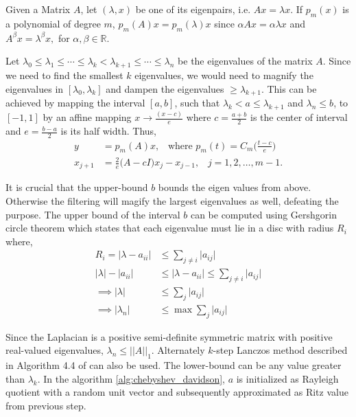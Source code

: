 \documentclass[10pt,a4paper, nocenter]{article}
\newcommand{\norm}[1]{\lvert\lvert {#1} \rvert\rvert}
\begin{document}
    Given a Matrix $A$, let $(\lambda, x)$ be one of its eigenpairs, i.e. $Ax = \lambda x$. If $p_m(x)$ is a polynomial of degree $m$, $p_m(A)x=p_m(\lambda)x$ since $\alpha Ax = \alpha\lambda x$ and $A^{\beta}x = \lambda^\beta x,$ for  $\alpha,\beta \in \mathbb{R}$. 
    
    Let $\lambda_0 \le \lambda_1 \le \cdots \le \lambda_k < \lambda_{k+1} \le \cdots \le \lambda_n$ be the eigenvalues of the matrix $A$. Since we need to find the smallest $k$ eigenvalues, we would need to magnify the eigenvalues in $[\lambda_0, \lambda_k]$ and dampen the eigenvalues $ \ge \lambda_{k+1}$. This can be achieved by mapping the interval $[a,b]$, such that $\lambda_k < a \le \lambda_{k+1}$ and $\lambda_n \le b$, to $[-1,1]$ by an affine mapping $x \to \frac{(x-c)}{e}$ where  $c = \frac{a+b}{2}$ is the center of interval and $e=\frac{b-a}{2}$ is its half width. Thus, \begin{align*}
    	y&=p_m(A)x, \hspace{10pt}\text{where }p_m(t)=C_m\bigg(\frac{t-c}{e}\bigg) \\
    	x_{j+1}&=\frac{2}{e}\big(A - cI\big)x_j - x_{j-1}, \hspace{10pt}j=1,2,\dots,m-1.
    	\end{align*}
    
    It is crucial that the upper-bound $b$ bounds the eigen values from above. Otherwise the filtering will magify the largest eigenvalues as well, defeating the purpose. The upper bound of the interval $b$ can be computed using Gershgorin circle theorem which states that each eigenvalue must lie in a disc with radius $R_i$ where, \begin{align*}
    	R_i = \lvert \lambda - a_{ii} \rvert &\le \sum_{j\ne i}\lvert a_{ij} \rvert \\
    	\lvert \lambda \rvert - \lvert a_{ii} \rvert &\le \lvert \lambda - a_{ii} \rvert \le \sum_{j\ne i}\lvert a_{ij} \rvert \\
    	\implies \lvert \lambda \rvert &\le \sum_{j}\lvert a_{ij} \rvert \\
    	\implies \lvert \lambda_n \rvert &\le \max \sum_{j}\lvert a_{ij} \rvert
    \end{align*} 
    
    Since the Laplacian is a positive semi-definite symmetric matrix with positive real-valued eigenvalues, $\lambda_n \le \norm{A}_{1}$. Alternately $k$-step Lanczos method described in Algorithm 4.4 of \cite{ZHOU2006172} can also be used. The lower-bound can be any value greater than $\lambda_k$. In the algorithm \ref{alg:chebyshev_davidson}, $a$ is initialized as Rayleigh quotient with a random unit vector and subsequently approximated as Ritz value from previous step.
    
\end{document}
